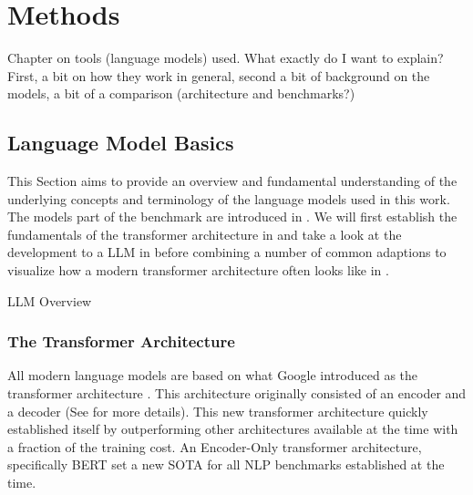 \chapter{Methods}\label{chap:methods}
{\color{blue}
Chapter on tools (language models) used. What exactly do I want to explain?
First, a bit on how they work in general, second a bit of background on the models, a bit of a comparison (architecture and benchmarks?)
}


\section{Language Model Basics}\label{sec:basics}
This Section aims to provide an overview and fundamental understanding of the underlying concepts and terminology of the language models used in this work.
The models part of the benchmark are introduced in .
We will first establish the fundamentals of the transformer architecture in  and take a look at the development to a \acrlong{LLM} in  before combining a number of common adaptions to visualize how a modern transformer architecture often looks like in .

LLM Overview \cite{naveed_comprehensive_2023}



\subsection{The Transformer Architecture}\label{sub:transformer}
All modern language models are based on what Google introduced as the transformer architecture \cite{vaswani_attention_2017}. 
This architecture originally consisted of an encoder and a decoder (See  for more details).
This new transformer architecture quickly established itself by outperforming other architectures available at the time with a fraction of the training cost.
An Encoder-Only transformer architecture, specifically \gls{BERT} set a new \gls{SOTA} for all \gls{NLP} benchmarks established at the time.


